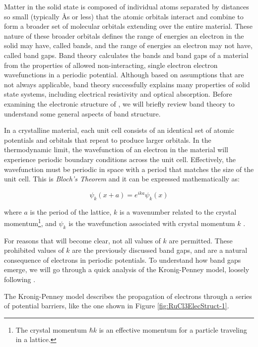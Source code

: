 Matter in the solid state is composed of individual atoms separated by distances so small (typically \AA s or less) that the atomic orbitals interact and combine to form a broader set of molecular orbitals extending over the entire material. These nature of these broader orbitals defines the range of energies an electron in the solid may have, called bands, and the range of energies an electron may not have, called band gaps. Band theory calculates the bands and band gaps of a material from the properties of allowed non-interacting, single electron electron wavefunctions in a periodic potential. Although based on assumptions that are not always applicable, band theory successfully explains many properties of solid state systems, including electrical resistivity and optical absorption. Before examining the electronic structure of \ruclnospace , we will briefly review band theory to understand some general aspects of band structure.

In a crystalline material, each unit cell consists of an identical set of atomic potentials and orbitals that repeat to produce larger orbitals. In the thermodynamic limit, the wavefunction of an electron in the material will experience periodic boundary conditions across the unit cell. Effectively, the wavefunction must be periodic in space with a period that matches the size of the unit cell. This is \textit{Bloch's Theorem} and it can be expressed mathematically as:

\begin{equation}
\psi_{k}(x + a) = e^{ika} \psi_{k}(x)
\end{equation}

where $a$ is the period of the lattice, $k$ is a wavenumber related to the crystal momentum\footnote{The crystal momentum $\hbar k$ is an effective momentum for a particle traveling in a lattice.}, and $\psi_{k}$ is the wavefunction associated with crystal momentum $k$ \cite{Davies1997}.

For reasons that will become clear, not all values of $k$ are permitted. These prohibited values of $k$ are the previously discussed band gaps, and are a natural consequence of electrons in periodic potentials. To understand how band gaps emerge, we will go through a quick analysis of the Kronig-Penney model, loosely following \cite{Davies1997}.

The Kronig-Penney model describes the propagation of electrons through a series of potential barriers, like the one shown in Figure \ref{fig:RuCl3ElecStruct-1}.


